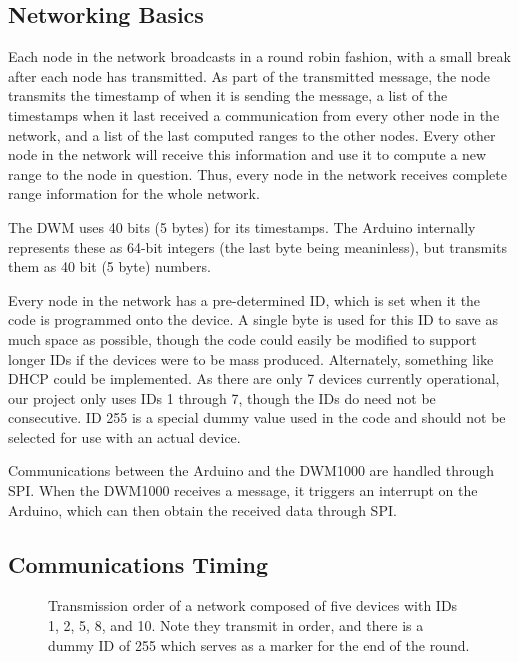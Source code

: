 \subsection{Networking Basics}

Each node in the network broadcasts in a round robin fashion, with a small break after each node has transmitted. As part of the transmitted message, the node transmits the timestamp of when it is sending the message, a list of the timestamps when it last received a communication from every other node in the network, and a list of the last computed ranges to the other nodes. Every other node in the network will receive this information and use it to compute a new range to the node in question. Thus, every node in the network receives complete range information for the whole network.

The DWM uses 40 bits (5 bytes) for its timestamps. The Arduino internally represents these as 64-bit integers (the last byte being meaninless), but transmits them as 40 bit (5 byte) numbers.

Every node in the network has a pre-determined ID, which is set when it the code is programmed onto the device. A single byte is used for this ID to save as much space as possible, though the code could easily be modified to support longer IDs if the devices were to be mass produced. Alternately, something like DHCP could be implemented. As there are only 7 devices currently operational, our project only uses IDs 1 through 7, though the IDs do need not be consecutive. ID 255 is a special dummy value used in the code and should not be selected for use with an actual device.

Communications between the Arduino and the DWM1000 are handled through SPI. When the DWM1000 receives a message, it triggers an interrupt on the Arduino, which can then obtain the received data through SPI.

\subsection{Communications Timing}

\begin{figure}
	\centering
	
	\decoRule
	\caption{Transmission order of a network composed of five devices with IDs 1, 2, 5, 8, and 10. Note they transmit in order, and there is a dummy ID of 255 which serves as a marker for the end of the round.}
	\label{fig:TransmissionOrder}
\end{figure}

